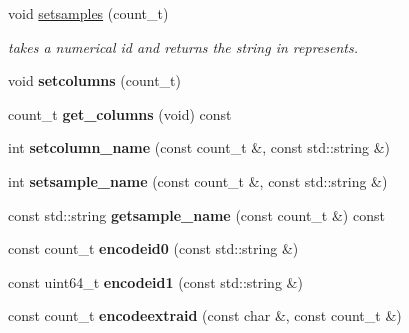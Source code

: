 \begin{DoxyCompactItemize}
\item 
\hypertarget{classprofile_a7f2ca504635bc0e0ee4cbe7af60cefab}{void \hyperlink{classprofile_a7f2ca504635bc0e0ee4cbe7af60cefab}{setsamples} (count\-\_\-t)}\label{classprofile_a7f2ca504635bc0e0ee4cbe7af60cefab}

\begin{DoxyCompactList}\small\item\em takes a numerical id and returns the string in represents. \end{DoxyCompactList}\item 
\hypertarget{classprofile_af3b7cfdb2950a22565e61470d354c9e7}{void {\bfseries setcolumns} (count\-\_\-t)}\label{classprofile_af3b7cfdb2950a22565e61470d354c9e7}

\item 
\hypertarget{classprofile_a0396db7cb43ab9ee7570b653d84efd3c}{count\-\_\-t {\bfseries get\-\_\-columns} (void) const }\label{classprofile_a0396db7cb43ab9ee7570b653d84efd3c}

\item 
\hypertarget{classprofile_aad49da8a92c55e53c236678a6797323f}{int {\bfseries setcolumn\-\_\-name} (const count\-\_\-t \&, const std\-::string \&)}\label{classprofile_aad49da8a92c55e53c236678a6797323f}

\item 
\hypertarget{classprofile_a46667541ccd87197eb4143311bb38a6e}{int {\bfseries setsample\-\_\-name} (const count\-\_\-t \&, const std\-::string \&)}\label{classprofile_a46667541ccd87197eb4143311bb38a6e}

\item 
\hypertarget{classprofile_ac90c9d2e224e477ea300abf6e86dfd31}{const std\-::string {\bfseries getsample\-\_\-name} (const count\-\_\-t \&) const }\label{classprofile_ac90c9d2e224e477ea300abf6e86dfd31}

\item 
\hypertarget{classprofile_abe096a4494739a3d0bfa94ef5a57f408}{const count\-\_\-t {\bfseries encodeid0} (const std\-::string \&)}\label{classprofile_abe096a4494739a3d0bfa94ef5a57f408}

\item 
\hypertarget{classprofile_a04d15aa05beabbae5dc14debf65412e5}{const uint64\-\_\-t {\bfseries encodeid1} (const std\-::string \&)}\label{classprofile_a04d15aa05beabbae5dc14debf65412e5}

\item 
\hypertarget{classprofile_aecbe5138b0570e29f4d21c754090462f}{const count\-\_\-t {\bfseries encodeextraid} (const char \&, const count\-\_\-t \&)}\label{classprofile_aecbe5138b0570e29f4d21c754090462f}


\end{DoxyCompactItemize}
